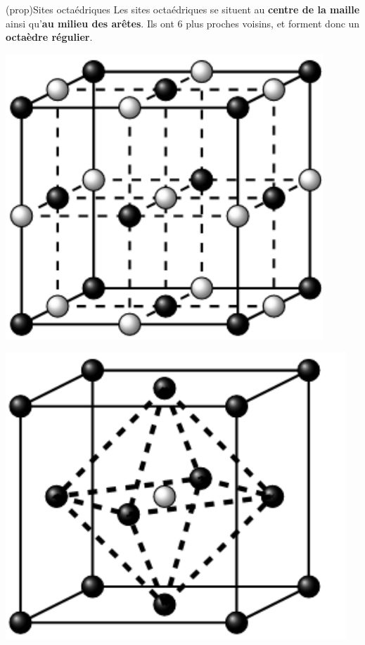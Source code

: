 \documentclass[../../main/main.tex]{subfiles}
\begin{document}
\begin{tcb*}(prop){Sites octaédriques}
	Les sites octaédriques se situent au \textbf{centre de la maille} ainsi
	qu'\textbf{au milieu des arêtes}. Ils ont 6 plus proches voisins, et forment
	donc un \textbf{octaèdre régulier}.
	\smallbreak
	\begin{isd}
		\begin{center}
			\includegraphics[scale=1]{sites_O-4.png}
		\end{center}
		\tcblower
		\begin{center}
			\includegraphics[scale=1]{sites_O-1.png}
		\end{center}
	\end{isd}
\end{tcb*}
\end{document}
